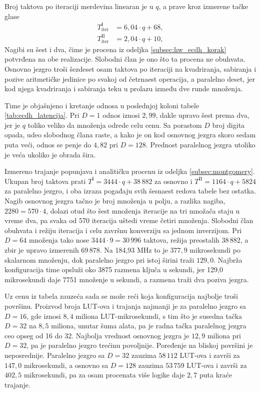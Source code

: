 Broj taktova po iteraciji merdevina linearan je u $q$, a prave kroz izmerene tačke glase
\begin{align}
    T^{\mathrm{I}}_{\mathrm{iter}}  &= 6{,}04 \cdot q + 68, \label{eq:ecdh_iter_f1} \\
    T^{\mathrm{II}}_{\mathrm{iter}} &= 2{,}04 \cdot q + 10, \label{eq:ecdh_iter_f2}
\end{align}
Nagibi su šest i dva, čime je procena iz odeljka \ref{subsec:hw_ecdh_korak} potvrđena na obe realizacije. Slobodni član je ono što ta procena ne obuhvata. Osnovno jezgro troši šezdeset osam taktova po iteraciji na kvadriranja, sabiranja i pozive aritmetičke jedinice po svakoj od četrnaest operacija, a paralelno deset, jer kod njega kvadriranja i sabiranja teku u prolazu između dve runde množenja.

Time je objašnjeno i kretanje odnosa u poslednjoj koloni tabele \ref{tab:ecdh_latencija}. Pri $D = 1$ odnos iznosi $2{,}99$, dakle upravo šest prema dva, jer je $q$ toliko veliko da množenja odrede celu cenu. Sa porastom $D$ broj digita opada, udeo slobodnog člana raste, a kako je on kod osnovnog jezgra skoro sedam puta veći, odnos se penje do $4{,}82$ pri $D = 128$. Prednost paralelnog jezgra utoliko je veća ukoliko je obrada šira.

Izmereno trajanje popunjava i analitičku procenu iz odeljka \ref{subsec:montgomery}. Ukupan broj taktova prati $T^{\mathrm{I}} = 3444 \cdot q + 38\,882$ za osnovno i $T^{\mathrm{II}} = 1164 \cdot q + 5824$ za paralelno jezgro, i oba izraza pogađaju svih šesnaest redova tabele bez ostatka. Nagib osnovnog jezgra tačno je broj množenja u polju, a razlika nagiba, $2280 = 570 \cdot 4$, dolazi otud što šest množenja iteracije na tri množača staju u vreme dva, pa svaka od 570 iteracija uštedi vreme četiri množenja. Slobodni član obuhvata i režiju iteracija i celu završnu konverziju sa jednom inverzijom. Pri $D = 64$ množenja tako nose $3444 \cdot 9 = 30\,996$ taktova, režija preostalih $38\,882$, a zbir je upravo izmerenih $69\,878$. Na 184,93 MHz to je $377{,}9$ mikrosekundi po skalarnom množenju, dok paralelno jezgro pri istoj širini traži $129{,}0$. Najbrža konfiguracija time opsluži oko 3875 razmena ključa u sekundi, jer 129,0 mikrosekundi daje 7751 množenje u sekundi, a razmena traži dva poziva jezgra.

Uz cenu iz tabela zauzeća sada se može reći koja konfiguracija najbolje troši površinu. Proizvod broja LUT-ova i trajanja najmanji je za paralelno jezgro sa $D = 16$, gde iznosi $8{,}4$ miliona LUT-mikrosekundi, s tim što je susedna tačka $D = 32$ na $8{,}5$ miliona, unutar šuma alata, pa je radna tačka paralelnog jezgra ceo opseg od 16 do 32. Najbolja vrednost osnovnog jezgra je $12{,}9$ miliona pri $D = 32$, pa je paralelno jezgro trećinu povoljnije. Poređenje na bliskoj površini je neposrednije. Paralelno jezgro sa $D = 32$ zauzima $58\,112$ LUT-ova i završi za $147{,}0$ mikrosekundi, a osnovno sa $D = 128$ zauzima $53\,759$ LUT-ova i završi za $402{,}5$ mikrosekundi, pa za osam procenata više logike daje $2{,}7$ puta kraće trajanje.

